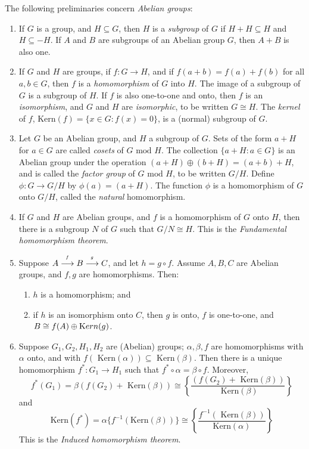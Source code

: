 \documentclass{article}
\begin{document}
The following preliminaries concern \emph{Abelian groups}:
\begin{enumerate}[\hspace{1cm}(1)]
  \item If $G$ is a group, and $H \subseteq G$, then $H$ is a \emph{subgroup} of $G$ if $H+H \subseteq H$ and $H \subseteq -H$. If $A$ and $B$ are subgroups of an Abelian group $G$, then $A+B$ is also one.
  \item If $G$ and $H$ are groups, if $f: G \longrightarrow H$, and if $f(a+b)=f(a)+f(b)$ for all $a,b \in G$, then $f$ is a \emph{homomorphism} of $G$ into $H$. The image of a subgroup of $G$ is a subgroup of $H$. If $f$ is also one-to-one and onto, then $f$ is an \emph{isomorphism}, and $G$ and $H$ are \emph{isomorphic}, to be written $G \cong H$. The \emph{kernel} of $f$, $\text{Kern}(f) = \{ x \in G: f(x)=0 \}$, is a (normal) subgroup of $G$.
  \item Let $G$ be an Abelian group, and $H$ a subgroup of $G$. Sets of the form $a+H$ for $a \in G$ are called \emph{cosets} of $G \text{ mod } H$. The collection $\{ a+H: a \in G \}$ is an Abelian group under the operation $(a+H) \oplus (b+H)=(a+b)+H$, and is called the \emph{factor group} of $G \text{ mod } H$, to be written $G/H$. Define $\phi: G \longrightarrow G/H$ by $\phi (a)=(a+H)$. The function $\phi$ is a homomorphism of $G$ onto $G/H$, called the \emph{natural} homomorphism.
  \item If $G$ and $H$ are Abelian groups, and $f$ is a homomorphism of $G$ onto $H$, then there is a subgroup $N$ of $G$ such that $G/N \cong H$. This is the \emph{Fundamental homomorphism theorem}.
  \item Suppose $A \buildrel ^f \over \longrightarrow B \buildrel ^g \over \longrightarrow C$, and let $h=g\circ f$. Assume $A,B,C$ are Abelian groups, and $f,g$ are homomorphisms. Then:
    \begin{enumerate}[\hspace{1cm}(a)]
      \item $h$ is a homomorphism; and
      \item if $h$ is an isomorphism onto $C$, then $g$ is onto, $f$ is one-to-one, and $B \cong f(A) \oplus {\text Kern}(g)$.
    \end{enumerate}
  \item Suppose $G_1,G_2,H_1,H_2$ are (Abelian) groups; $\alpha,\beta, f$ are homomorphisms with $\alpha$ onto, and with $f(\text{ Kern}(\alpha)) \subseteq \text{ Kern}(\beta)$. Then there is a unique homomorphism $f^*: G_1 \longrightarrow H_1$ such that $f^* \circ \alpha = \beta \circ f$. Moreover,
    \begin{equation*}
    f^*(G_1)=\beta (f(G_2)+\text{ Kern}(\beta)) \cong \left\{ \frac{ (f(G_2)+\text{ Kern}(\beta)) }{ \text{ Kern}(\beta) } \right\}
    \end{equation*}
    and
    \begin{equation*}
    \text{Kern}(f^*)= \alpha \{ f^{-1}(\text{Kern}(\beta)) \} \cong \left\{ \frac{ f^{-1}(\text{ Kern}(\beta)) }{ \text{Kern}(\alpha) } \right\}
    \end{equation*}
    This is the \emph{Induced homomorphism theorem}.


\end{enumerate}
\end{document}
